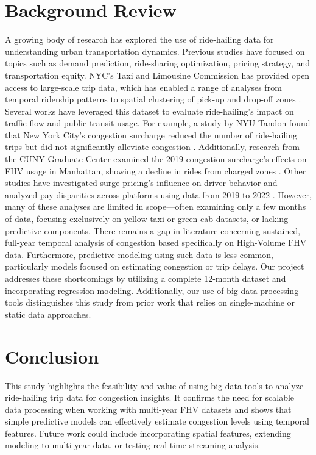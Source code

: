\documentclass{article}
\begin{document}
\section{Background Review}

A growing body of research has explored the use of ride-hailing data for understanding urban transportation dynamics. Previous studies have focused on topics such as demand prediction, ride-sharing optimization, pricing strategy, and transportation equity. NYC’s Taxi and Limousine Commission has provided open access to large-scale trip data, which has enabled a range of analyses from temporal ridership patterns to spatial clustering of pick-up and drop-off zones \cite{nyctlc2023}.
Several works have leveraged this dataset to evaluate ride-hailing’s impact on traffic flow and public transit usage. For example, a study by NYU Tandon found that New York City’s congestion surcharge reduced the number of ride-hailing trips but did not significantly alleviate congestion \cite{nyu2023}. Additionally, research from the CUNY Graduate Center examined the 2019 congestion surcharge’s effects on FHV usage in Manhattan, showing a decline in rides from charged zones \cite{cuny2023}.
Other studies have investigated surge pricing’s influence on driver behavior \cite{surgepricing2022} and analyzed pay disparities across platforms using data from 2019 to 2022 \cite{ucla2023}. However, many of these analyses are limited in scope—often examining only a few months of data, focusing exclusively on yellow taxi or green cab datasets, or lacking predictive components.
There remains a gap in literature concerning sustained, full-year temporal analysis of congestion based specifically on High-Volume FHV data. Furthermore, predictive modeling using such data is less common, particularly models focused on estimating congestion or trip delays. Our project addresses these shortcomings by utilizing a complete 12-month dataset and incorporating regression modeling. Additionally, our use of big data processing tools distinguishes this study from prior work that relies on single-machine or static data approaches.

\section{Conclusion}
This study highlights the feasibility and value of using big data tools to analyze ride-hailing trip data for congestion insights. It confirms the need for scalable data processing when working with multi-year FHV datasets and shows that simple predictive models can effectively estimate congestion levels using temporal features. Future work could include incorporating spatial features, extending modeling to multi-year data, or testing real-time streaming analysis.



\end{document}
